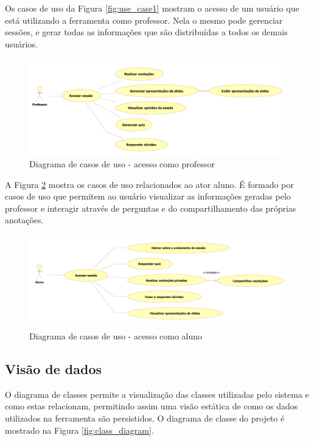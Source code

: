 Os casos de uso da Figura \ref{fig:use_case1} mostram o acesso de um usuário que está utilizando a ferramenta como professor. Nela o mesmo pode gerenciar sessões, e gerar todas as informações que são distribuídas a todos os demais usuários.
 

\begin{figure}[!h]
\centering
\includegraphics[width=1.0\textwidth]{pdfs/img-use-case2.pdf} 
\caption{Diagrama de casos de uso - acesso como professor}
\label{fig:use_case2} 
\end{figure}

A Figura \ref{fig:use_case3} mostra os casos de uso relacionados ao ator aluno. É formado por casos de uso que permitem ao usuário visualizar as informações geradas pelo professor e interagir através de perguntas e do compartilhamento das próprias anotações.

 
\begin{figure}[!h]
\centering
\includegraphics[width=1.0\textwidth]{pdfs/img-use-case3.pdf} 
\caption{Diagrama de casos de uso - acesso como aluno}
\label{fig:use_case3} 
\end{figure}

\subsection{Visão de dados}

O diagrama de classes permite a visualização das classes utilizadas pelo sistema e como estas relacionam, permitindo assim uma visão estática de como os dados utilizados na ferramenta são persistidos. O diagrama de classe do projeto é mostrado na Figura \ref{fig:class_diagram}.


